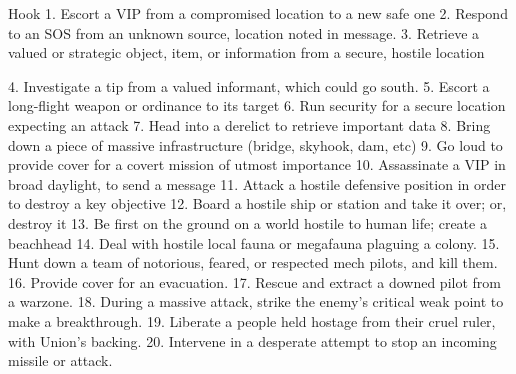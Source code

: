 Hook
    1.  Escort a VIP from a compromised location to a new safe one
    2.  Respond to an SOS from an unknown source, location noted in message.
    3.  Retrieve a valued or strategic object, item, or information from a secure, hostile location




    4.  Investigate a tip from a valued informant, which could go south.
    5.  Escort a long-flight weapon or ordinance to its target
    6.  Run security for a secure location expecting an attack
    7.  Head into a derelict to retrieve important data
    8.  Bring down a piece of massive infrastructure (bridge, skyhook, dam, etc)
    9.  Go loud to provide cover for a covert mission of utmost importance
    10. Assassinate a VIP in broad daylight, to send a message
    11. Attack a hostile defensive position in order to destroy a key objective
    12. Board a hostile ship or station and take it over; or, destroy it
    13. Be first on the ground on a world hostile to human life; create a beachhead
    14. Deal with hostile local fauna or megafauna plaguing a colony.
    15. Hunt down a team of notorious, feared, or respected mech pilots, and kill them.
    16. Provide cover for an evacuation.
    17. Rescue and extract a downed pilot from a warzone.
    18. During a massive attack, strike the enemy’s critical weak point to make a breakthrough.
    19. Liberate a people held hostage from their cruel ruler, with Union’s backing.
    20. Intervene in a desperate attempt to stop an incoming missile or attack.

